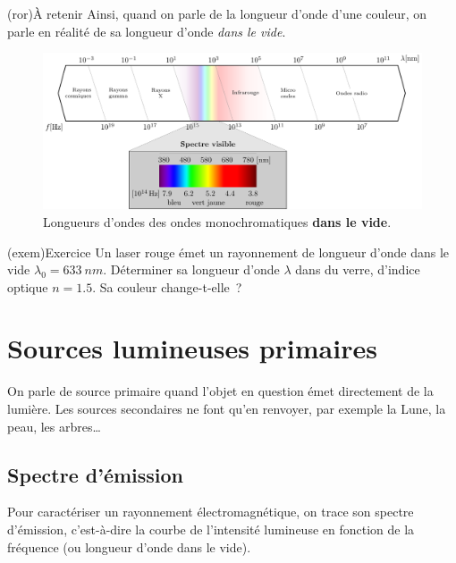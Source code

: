 \documentclass[../../main/main.tex]{subfiles}
\begin{document}
\begin{tcb}(ror){À retenir}
	Ainsi, quand on parle de la longueur d'onde d'une couleur, on parle en réalité
	de sa longueur d'onde \textit{dans le vide}.
\end{tcb}

\begin{figure}[h]
	\centering
	\includegraphics[width=.10\linewidth]{full_spectre}
	\caption{Longueurs d'ondes des ondes monochromatiques \textbf{dans le vide}.}
	\label{fig:lambda_vis}
\end{figure}

\begin{tcb}(exem){Exercice}
	Un laser rouge émet un rayonnement de longueur d'onde dans le vide
	$\lambda_0 = \SI{633}{nm}$. Déterminer sa longueur d'onde $\lambda$ dans du
	verre, d'indice optique $n = \num{1.5}$. Sa couleur change-t-elle~?
	\tcblower
\end{tcb}

\section{Sources lumineuses primaires}

On parle de source primaire quand l'objet en question émet directement de la
lumière. Les sources secondaires ne font qu'en renvoyer, par exemple la Lune, la
peau, les arbres…

\subsection{Spectre d'émission}

Pour caractériser un rayonnement électromagnétique, on trace son spectre
d'émission, c'est-à-dire la courbe de l'intensité lumineuse en fonction de la
fréquence (ou longueur d'onde dans le vide).
\end{document}
